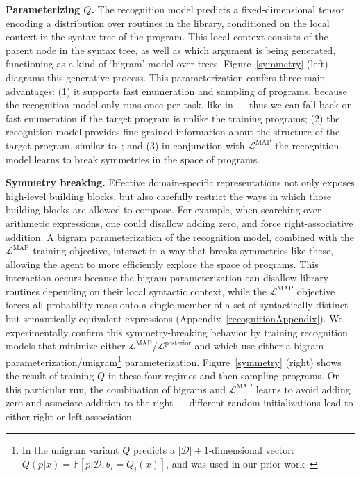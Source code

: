 \documentclass{article}
\newcommand{\probability}{\mathds{P}} %
\begin{document}
\noindent\textbf{Parameterizing $Q$.} The recognition model predicts a
fixed-dimensional tensor encoding a distribution over routines in
the library, conditioned on the local context in the syntax tree of the
program. This local context consists of the parent node in the syntax
tree, as well as which argument is being generated, functioning as a
kind of `bigram' model over trees. Figure~\ref{symmetry} (left)
diagrams this generative process.  This parameterization confers three
main advantages: (1) it supports fast enumeration and sampling of
programs, because the recognition model only runs once per
task, like in~\cite{balog2016deepcoder,ecc,menon2013machine} -- thus
we can fall back on fast enumeration if the target program is unlike
the training programs; (2) the recognition model provides fine-grained
information about the structure of the target program, similar
to~\cite{devlin2017robustfill,zavershynskyi2018naps}; and (3) in
conjunction with $\mathcal{L}^{\text{MAP}}$ the recognition model
learns to break symmetries in the space of programs.

\noindent\textbf{Symmetry breaking.} Effective domain-specific representations not only exposes high-level building blocks, but also
carefully restrict the ways in which those building blocks are
allowed to compose.  For example,
when searching over arithmetic expressions, one could disallow adding zero, and force
right-associative addition. A bigram parameterization of the recognition
model, combined with the $\mathcal{L}^{\text{MAP}}$ training
objective, interact in a way that breaks symmetries like these, allowing the agent to more efficiently explore the space of
programs.  This interaction occurs because the bigram parameterization
can disallow library routines depending on their local syntactic
context, while the $\mathcal{L}^{\text{MAP}}$ objective forces all
probability mass onto a single member of a set of syntactically
distinct but semantically equivalent expressions
(Appendix~\ref{recognitionAppendix}).
We experimentally confirm this symmetry-breaking
behavior by training recognition models that minimize either
$\mathcal{L}^{\text{MAP}}$/$\mathcal{L}^\text{posterior}$ and which
use either a bigram parameterization/unigram\footnote{In the unigram variant $Q$ predicts a $|\mathcal{D}| + 1$-dimensional vector: $Q(p|x) = \probability[p|\mathcal{D},\theta_i = Q_i(x)]$,
  and was used in our prior work~\cite{ecc}} parameterization.
Figure~\ref{symmetry} (right) shows the result of training $Q$ in these four regimes
and then sampling programs.
On this particular run,
the combination of
bigrams and $\mathcal{L}^{\text{MAP}}$ learns to
avoid adding zero and associate addition to the right ---
different random initializations
lead to either right or left association.
\end{document}
